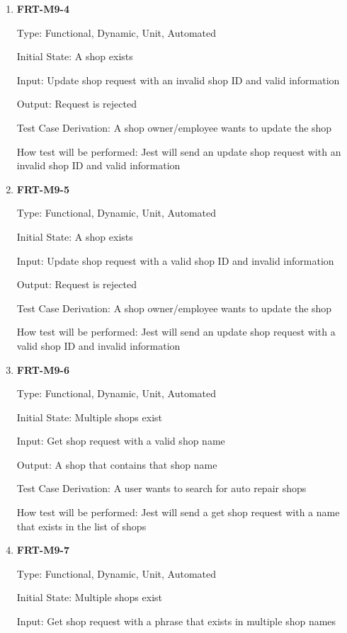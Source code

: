 \documentclass[12pt, titlepage]{article}
\begin{document}
\begin{enumerate}
	\item \textbf{FRT-M9-4}

	      Type: Functional, Dynamic, Unit, Automated

	      Initial State: A shop exists

	      Input: Update shop request with an invalid shop ID and valid information

	      Output: Request is rejected

	      Test Case Derivation: A shop owner/employee wants to update the shop

	      How test will be performed: Jest will send an update shop request with an invalid shop ID and valid
	      information

	\item \textbf{FRT-M9-5}

	      Type: Functional, Dynamic, Unit, Automated

	      Initial State: A shop exists

	      Input: Update shop request with a valid shop ID and invalid information

	      Output: Request is rejected

	      Test Case Derivation: A shop owner/employee wants to update the shop

	      How test will be performed: Jest will send an update shop request with a valid shop ID and invalid
	      information

	\item \textbf{FRT-M9-6}

	      Type: Functional, Dynamic, Unit, Automated

	      Initial State: Multiple shops exist

	      Input: Get shop request with a valid shop name

	      Output: A shop that contains that shop name

	      Test Case Derivation: A user wants to search for auto repair shops

	      How test will be performed: Jest will send a get shop request with a name that exists in the list
	      of shops

	\item \textbf{FRT-M9-7}

	      Type: Functional, Dynamic, Unit, Automated

	      Initial State: Multiple shops exist

	      Input: Get shop request with a phrase that exists in multiple shop names


\end{enumerate}
\end{document}
